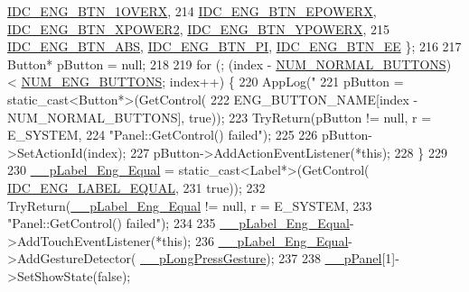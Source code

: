 \begin{DoxyCode}
{      \hyperlink{_app_resource_id_8h_ae6bb609145f84556bef872fb7d834591}{IDC\_ENG\_BTN\_1OVERX},
214                 \hyperlink{_app_resource_id_8h_a194f3379d7571573a4f7b5ade7a154be}{IDC\_ENG\_BTN\_EPOWERX}, \hyperlink{_app_resource_id_8h_ae0933b2b7c99a7cdf87bee766cb22464}{IDC\_ENG\_BTN\_XPOWER2}, 
      \hyperlink{_app_resource_id_8h_a67469a1e411123f505558f6d85380df5}{IDC\_ENG\_BTN\_YPOWERX},
215                 \hyperlink{_app_resource_id_8h_a728fa3877046bda1d388c4b8073b25f0}{IDC\_ENG\_BTN\_ABS}, \hyperlink{_app_resource_id_8h_addfba30a630be40851e7e3f718a878d3}{IDC\_ENG\_BTN\_PI}, 
      \hyperlink{_app_resource_id_8h_ab605ab7c4c33aee9e3d09da319df9c1d}{IDC\_ENG\_BTN\_EE} \};
216 
217         Button* pButton = null;
218 
219         \textcolor{keywordflow}{for} (; (index - \hyperlink{_calculator_form_8cpp_a5231d80877ae945c17f323f927dd1bcf}{NUM\_NORMAL\_BUTTONS}) < \hyperlink{_calculator_form_8cpp_a07008d1eb5c7e6f7b9e3459e232346a7}{NUM\_ENG\_BUTTONS}; index++) \{
220             AppLog(\textcolor{stringliteral}{"%
221             pButton = \textcolor{keyword}{static\_cast<}Button*\textcolor{keyword}{>}(GetControl(
222                     ENG\_BUTTON\_NAME[index - NUM\_NORMAL\_BUTTONS], \textcolor{keyword}{true}));
223             TryReturn(pButton != null, r = E\_SYSTEM,
224             \textcolor{stringliteral}{"Panel::GetControl() failed"});
225 
226             pButton->SetActionId(index);
227             pButton->AddActionEventListener(*\textcolor{keyword}{this});
228         \}
229 
230         \hyperlink{class_calculator_form_a57055baa16d93e319c193d01bf833bc7}{\_\_pLabel\_Eng\_Equal} = \textcolor{keyword}{static\_cast<}Label*\textcolor{keyword}{>}(GetControl(
      \hyperlink{_app_resource_id_8h_a5ee0add75a868fc13d0208363a79c974}{IDC\_ENG\_LABEL\_EQUAL},
231                 \textcolor{keyword}{true}));
232         TryReturn(\hyperlink{class_calculator_form_a57055baa16d93e319c193d01bf833bc7}{\_\_pLabel\_Eng\_Equal} != null, r = E\_SYSTEM,
233         \textcolor{stringliteral}{"Panel::GetControl() failed"});
234 
235         \hyperlink{class_calculator_form_a57055baa16d93e319c193d01bf833bc7}{\_\_pLabel\_Eng\_Equal}->AddTouchEventListener(*\textcolor{keyword}{this});
236         \hyperlink{class_calculator_form_a57055baa16d93e319c193d01bf833bc7}{\_\_pLabel\_Eng\_Equal}->AddGestureDetector(
      \hyperlink{class_calculator_form_ae2c4d24712fa767d536ffc901810bff3}{\_\_pLongPressGesture});
237 
238         \hyperlink{class_calculator_form_ae930aeea4ccaf0fd752c11350c6e2af6}{\_\_pPanel}[1]->SetShowState(\textcolor{keyword}{false});
}}
\end{DoxyCode}
